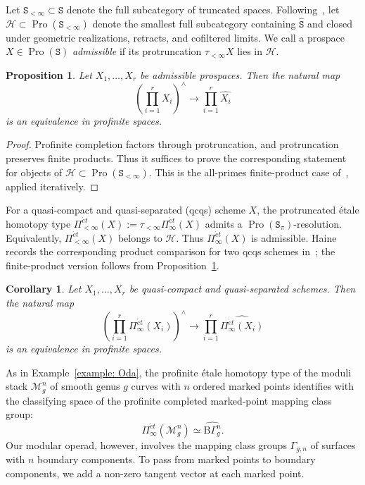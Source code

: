 \documentclass{amsart}
\newcommand{\isSet}{\mathtt{S}}
\newcommand{\Pro}{\operatorname{Pro}}
\newcommand{\cs}{\mathrm{B}}
\newtheorem{prop}[theorem]{Proposition}%
\newtheorem{cor}[theorem]{Corollary}%
\theoremstyle{definition}
\numberwithin{equation}{section}
\begin{document}
Let $\isSet_{<\infty}\subset\isSet$ denote the full subcategory of truncated spaces. Following~\cite[Notation~2.11]{haine2024profinite}, let $\mathcal H\subset\Pro(\isSet_{<\infty})$ denote the smallest full subcategory containing
$\widehat{\isSet}$ and closed under geometric realizations, retracts, and cofiltered limits. We call a prospace $X\in\Pro(\isSet)$ \emph{admissible} if its protruncation $\tau_{<\infty}X$ lies in $\mathcal H$.

\begin{prop}\label{prop:haine-product}
Let $X_1,\ldots,X_r$ be admissible prospaces. Then the natural map
\[
\left(\prod_{i=1}^r X_i\right)^{\wedge}
\longrightarrow
\prod_{i=1}^r \widehat{X_i}
\]
is an equivalence in profinite spaces.
\end{prop}

\begin{proof}
Profinite completion factors through protruncation, and protruncation preserves finite products. Thus it suffices to prove the corresponding statement for objects of $\mathcal H\subset\Pro(\isSet_{<\infty})$. This is the all-primes finite-product case of~\cite[Theorem~2.13]{haine2024profinite}, applied iteratively.
\end{proof}

For a quasi-compact and quasi-separated (qcqs) scheme $X$, the protruncated étale homotopy type $\Pi^{\acute et}_{<\infty}(X):=\tau_{<\infty}\Pi^{\acute et}_{\infty}(X)$ admits a $\Pro(\isSet_{\pi})$-resolution. Equivalently, $\Pi^{\acute et}_{<\infty}(X)$ belongs to $\mathcal H$. Thus $\Pi^{\acute et}_{\infty}(X)$ is admissible. Haine records the corresponding product comparison for two qcqs schemes in~\cite[Example~2.17]{haine2024profinite}; the finite-product version follows from Proposition~\ref{prop:haine-product}.

\begin{cor}\label{cor:haine-qcqs-schemes}
Let $X_1,\ldots,X_r$ be quasi-compact and quasi-separated schemes. Then the natural map
\[
\left(\prod_{i=1}^r \Pi^{\acute et}_{\infty}(X_i)\right)^{\wedge}
\longrightarrow
\prod_{i=1}^r \widehat{\Pi^{\acute et}_{\infty}(X_i)}
\]
is an equivalence in profinite spaces.
\end{cor}

As in Example~\ref{example: Oda}, the profinite étale homotopy type of the moduli stack $\mathcal M_g^n$ of smooth genus $g$ curves with $n$ ordered marked points identifies with the classifying space of the profinite completed marked-point mapping class group:
\[
\Pi^{\acute et}_{\infty}(\mathcal M_g^n)
\simeq
\widehat{\cs\Gamma_g^n}.
\]
Our modular operad, however, involves the mapping class groups $\Gamma_{g,n}$ of surfaces with $n$ boundary components. To pass from marked points to boundary components, we add a non-zero tangent vector at each marked point.
\end{document}
